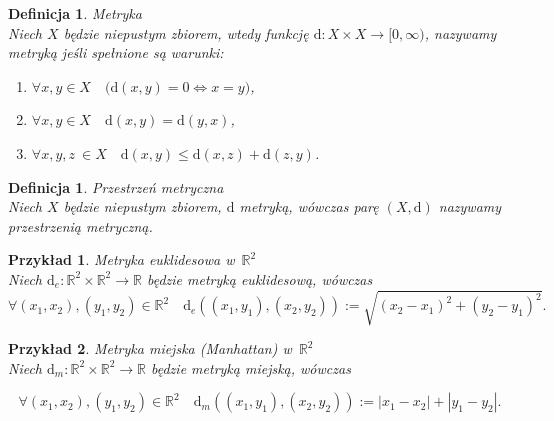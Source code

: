 \documentclass[12pt,a4paper]{report}
\newtheorem{definition}[theorem]{Definicja}
\newtheorem{example}{Przykład}
\begin{document}
\begin{definition}{Metryka \cite[Rozdzial 9]{kuratowski2004}}\\
Niech $X$ będzie niepustym zbiorem, wtedy funkcję $\mathrm{d}: X \times X \rightarrow [0,\infty)$, nazywamy metryką jeśli spełnione są warunki:
\begin{enumerate}
\item $\forall x, y \in X \quad \big(\mathrm{d}(x,y) = 0  \Longleftrightarrow x=y \big)$,
\item $\forall x, y \in X \quad \mathrm{d}(x,y)=\mathrm{d}(y,x)$,
\item $\forall  x, y, z~\in X \quad \mathrm{d}(x,y)\leq \mathrm{d}(x,z)+\mathrm{d}(z,y)$.
\end{enumerate}
\end{definition}


\begin{definition}{Przestrzeń metryczna \cite[Rozdział 9]{kuratowski2004}}\\
Niech $X$ będzie niepustym zbiorem, $\mathrm{d}$ metryką, wówczas parę $(X,\mathrm{d})$ nazywamy przestrzenią metryczną. 
\end{definition}


\begin{example}{Metryka euklidesowa w~$\mathbb{R}^2$}\\
Niech $\mathrm{d}_e: \mathbb{R}^2 \times \mathbb{R}^2 \rightarrow \mathbb{R}$ będzie metryką euklidesową, wówczas
$$\forall{(x_{1},x_{2}),(y_{1},y_{2}) \in \mathbb{R}^2} \quad \mathrm{d}_e((x_1,y_1),(x_2,y_2)):= \sqrt{(x_2-x_1)^2+(y_2-y_1)^2}. $$
\end{example}


\begin{example}{Metryka miejska (Manhattan) w~$\mathbb{R}^2$}\\
Niech $\mathrm{d}_m: \mathbb{R}^2 \times \mathbb{R}^2 \rightarrow \mathbb{R}$ będzie metryką miejską, wówczas 

$$\forall{(x_{1},x_{2}),(y_{1},y_{2}) \in \mathbb{R}^2} \quad \mathrm{d}_m((x_1,y_1),(x_2,y_2)):=|x_1-x_2|+|y_1-y_2|.$$

\end{example}
\end{document}
